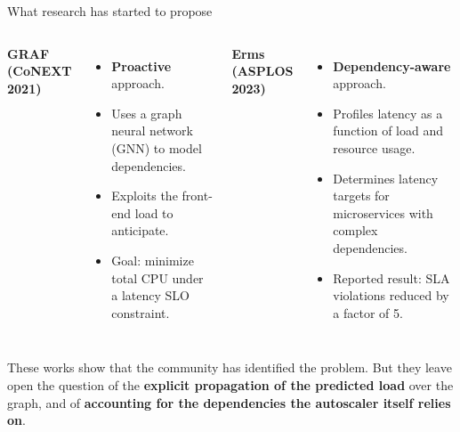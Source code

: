 \documentclass[10pt]{beamer}
\begin{document}
\begin{frame}{What research has started to propose}
  \begin{columns}[T]
    \textbf{GRAF (CoNEXT 2021)}
    \begin{itemize}
      \item \textbf{Proactive} approach.
      \item Uses a graph neural network (GNN) to model dependencies.
      \item Exploits the front-end load to anticipate.
      \item Goal: minimize total CPU under a latency SLO constraint.
    \end{itemize}

    \textbf{Erms (ASPLOS 2023)}
    \begin{itemize}
      \item \textbf{Dependency-aware} approach.
      \item Profiles latency as a function of load and resource usage.
      \item Determines latency targets for microservices with complex dependencies.
      \item Reported result: SLA violations reduced by a factor of 5.
    \end{itemize}
  \end{columns}

  \vspace{0.5cm}
  \centering
  \footnotesize
  These works show that the community has identified the problem. But they leave open the question of the \textbf{explicit propagation of the predicted load} over the graph, and of \textbf{accounting for the dependencies the autoscaler itself relies on}.
\end{frame}
\end{document}
